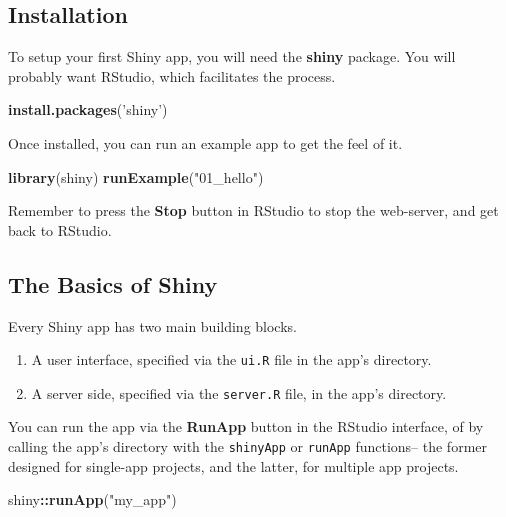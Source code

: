 \documentclass[]{book}
\newenvironment{Shaded}{\begin{snugshade}}{\end{snugshade}}
\newcommand{\KeywordTok}[1]{\textcolor[rgb]{0.13,0.29,0.53}{\textbf{#1}}}
\newcommand{\StringTok}[1]{\textcolor[rgb]{0.31,0.60,0.02}{#1}}
\newcommand{\OperatorTok}[1]{\textcolor[rgb]{0.81,0.36,0.00}{\textbf{#1}}}
\newcommand{\NormalTok}[1]{#1}
\providecommand{\tightlist}{%
  \setlength{\itemsep}{0pt}\setlength{\parskip}{0pt}}
\theoremstyle{definition}
\theoremstyle{definition}
\theoremstyle{definition}
\theoremstyle{remark}
\begin{document}
\subsection{Installation}\label{installation-1}

To setup your first Shiny app, you will need the \textbf{shiny} package.
You will probably want RStudio, which facilitates the process.

\begin{Shaded}
\begin{Highlighting}[]
\KeywordTok{install.packages}\NormalTok{(}\StringTok{'shiny'}\NormalTok{)}
\end{Highlighting}
\end{Shaded}

Once installed, you can run an example app to get the feel of it.

\begin{Shaded}
\begin{Highlighting}[]
\KeywordTok{library}\NormalTok{(shiny)}
\KeywordTok{runExample}\NormalTok{(}\StringTok{"01_hello"}\NormalTok{)}
\end{Highlighting}
\end{Shaded}

Remember to press the \textbf{Stop} button in RStudio to stop the
web-server, and get back to RStudio.

\subsection{The Basics of Shiny}\label{the-basics-of-shiny}

Every Shiny app has two main building blocks.

\begin{enumerate}
\def\labelenumi{\arabic{enumi}.}
\tightlist
\item
  A user interface, specified via the \texttt{ui.R} file in the app's
  directory.
\item
  A server side, specified via the \texttt{server.R} file, in the app's
  directory.
\end{enumerate}

You can run the app via the \textbf{RunApp} button in the RStudio
interface, of by calling the app's directory with the \texttt{shinyApp}
or \texttt{runApp} functions-- the former designed for single-app
projects, and the latter, for multiple app projects.

\begin{Shaded}
\begin{Highlighting}[]
\NormalTok{shiny}\OperatorTok{::}\KeywordTok{runApp}\NormalTok{(}\StringTok{"my_app"}\NormalTok{)}
\end{Highlighting}
\end{Shaded}
\end{document}

